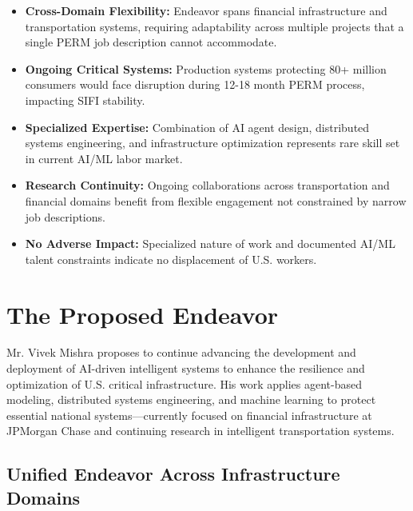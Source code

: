 \documentclass[11pt]{article}
\newcommand{\dr}{Mr. Vivek Mishra }
\begin{document}
\begin{itemize}
    \item \textbf{Cross-Domain Flexibility:} Endeavor spans financial infrastructure and transportation systems, requiring adaptability across multiple projects that a single PERM job description cannot accommodate.
    
    \item \textbf{Ongoing Critical Systems:} Production systems protecting 80+ million consumers would face disruption during 12-18 month PERM process, impacting SIFI stability.
    
    \item \textbf{Specialized Expertise:} Combination of AI agent design, distributed systems engineering, and infrastructure optimization represents rare skill set in current AI/ML labor market.
    
    \item \textbf{Research Continuity:} Ongoing collaborations across transportation and financial domains benefit from flexible engagement not constrained by narrow job descriptions.
    
    \item \textbf{No Adverse Impact:} Specialized nature of work and documented AI/ML talent constraints indicate no displacement of U.S. workers.
\end{itemize}

\pagebreak


\section{The Proposed Endeavor}
\label{sec:endeavor}

\dr proposes to continue advancing the development and deployment of 
AI-driven intelligent systems to enhance the resilience and optimization of 
U.S. critical infrastructure. His work applies agent-based modeling, distributed 
systems engineering, and machine learning to protect essential national systems—currently 
focused on financial infrastructure at JPMorgan Chase and continuing research in 
intelligent transportation systems.

\subsection{Unified Endeavor Across Infrastructure Domains}
\end{document}
